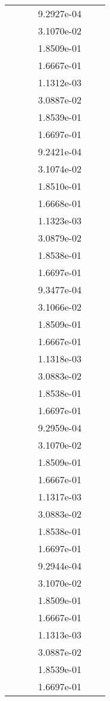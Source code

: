 \begin{xltabular}{\textwidth}{r|rS[table-format=1.3e+2]S[table-format=1.4e+2]S[table-format=1.4e+2]S[table-format=-1.5]}
&  &  & 9.2927e-04 & & \\
&  &  & 3.1070e-02 & & \\
&  &  & 1.8509e-01 & & \\
&  &  & 1.6667e-01 & & \\
&  &  & 1.1312e-03 & & \\
&  &  & 3.0887e-02 & & \\
&  &  & 1.8539e-01 & & \\
&  &  & 1.6697e-01 & & \\
&  &  & 9.2421e-04 & & \\
&  &  & 3.1074e-02 & & \\
&  &  & 1.8510e-01 & & \\
&  &  & 1.6668e-01 & & \\
&  &  & 1.1323e-03 & & \\
&  &  & 3.0879e-02 & & \\
&  &  & 1.8538e-01 & & \\
&  &  & 1.6697e-01 & & \\
&  &  & 9.3477e-04 & & \\
&  &  & 3.1066e-02 & & \\
&  &  & 1.8509e-01 & & \\
&  &  & 1.6667e-01 & & \\
&  &  & 1.1318e-03 & & \\
&  &  & 3.0883e-02 & & \\
&  &  & 1.8538e-01 & & \\
&  &  & 1.6697e-01 & & \\
&  &  & 9.2959e-04 & & \\
&  &  & 3.1070e-02 & & \\
&  &  & 1.8509e-01 & & \\
&  &  & 1.6667e-01 & & \\
&  &  & 1.1317e-03 & & \\
&  &  & 3.0883e-02 & & \\
&  &  & 1.8538e-01 & & \\
&  &  & 1.6697e-01 & & \\
&  &  & 9.2944e-04 & & \\
&  &  & 3.1070e-02 & & \\
&  &  & 1.8509e-01 & & \\
&  &  & 1.6667e-01 & & \\
&  &  & 1.1313e-03 & & \\
&  &  & 3.0887e-02 & & \\
&  &  & 1.8539e-01 & & \\
&  &  & 1.6697e-01 & & \\

\end{xltabular}
